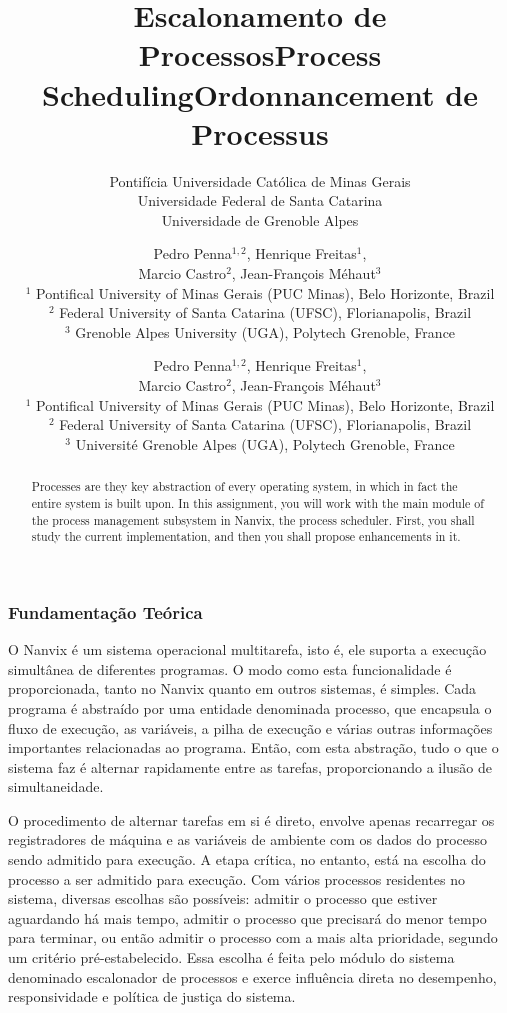 \documentclass[11pt]{article}
\title{Escalonamento de Processos}
\author{
	\small Pontifícia Universidade Católica de Minas Gerais\\
	\small Universidade Federal de Santa Catarina\\
	\small Universidade de Grenoble Alpes
}
\date{}
\title{Process Scheduling}
\author {
	Pedro Penna$^{1,2}$, Henrique Freitas$^{1}$,\\
	Marcio Castro$^{2}$, Jean-François Méhaut$^{3}$\\[0.3em]
	\small $^{1}$ Pontifical University of Minas Gerais (PUC Minas), Belo Horizonte, Brazil\\
	\small $^{2}$ Federal University of Santa Catarina (UFSC), Florianapolis, Brazil\\
	\small $^{3}$ Grenoble Alpes University (UGA), Polytech Grenoble, France}
\date {}
\title{Ordonnancement de Processus}
\author {
	Pedro Penna$^{1,2}$, Henrique Freitas$^{1}$,\\
	Marcio Castro$^{2}$, Jean-François Méhaut$^{3}$\\[0.3em]
	\small $^{1}$ Pontifical University of Minas Gerais (PUC Minas), Belo Horizonte, Brazil\\
	\small $^{2}$ Federal University of Santa Catarina (UFSC), Florianapolis, Brazil\\
	\small $^{3}$ Université Grenoble Alpes (UGA), Polytech Grenoble, France}
\date {}
\newif\ifbr
\newif\ifen
\newif\iffr
\begin{document}
\maketitle

\begin{abstract}

\ifbr
	\noindent Processos consistem na abstração fundamental de um sistema
	operacional: todo o resto do sistema é arquitetado com base nesta
	entidade. Neste projeto, você trabalhará com o principal componente do
	módulo de gerenciamento de processos do Nanvix, o escalonador de
	processos. Primeiramente, você irá estudar como o componente existente
	opera e, em seguida, irá propor melhorias a ele.
\else\ifen
	\noindent Processes are they key abstraction of every operating
	system, in which in fact the entire system is built upon. In this
	assignment, you will work with the main module of the process
	management subsystem in Nanvix, the process scheduler. First, you shall
	study the current implementation, and then you shall propose
	enhancements in it.
\else\iffr
	\noindent Le processus est l'abstraction clé de tout système
	d'exploitation. La conséquence est qu'un système d'exploitation,
	comme Nanvix, repose sur ce concept. Pour cette étape, vous
	travaillerez sur le module principal du sous-système de gestion des
	processus de Nanvix, l'ordonnanceur de processus (\textit{process
	scheduler}). Au départ, vous étudierez et analyserez
	l'implémentation fournie avec Nanvix, et vous proposerez et
	implémenterez ensuite des extensions à cet ordonnanceur.
\fi\fi\fi

\end{abstract}

\ifbr
	\subsubsection*{Fundamentação Teórica}

		O Nanvix é um sistema operacional multitarefa, isto é, ele suporta a
		execução simultânea de diferentes programas. O modo como esta
		funcionalidade é proporcionada, tanto no Nanvix quanto em outros
		sistemas, é simples. Cada programa é abstraído por uma entidade
		denominada processo, que encapsula o fluxo de execução, as
		variáveis, a pilha de execução e várias outras informações
		importantes relacionadas ao programa. Então, com esta abstração,
		tudo o que o sistema faz é alternar rapidamente entre as tarefas,
		proporcionando a ilusão de simultaneidade.

		O procedimento de alternar tarefas em si é direto, envolve apenas
		recarregar os registradores de máquina e as variáveis de ambiente
		com os dados do processo sendo admitido para execução. A etapa
		crítica, no entanto, está na escolha do processo a ser admitido para
		execução. Com vários processos residentes no sistema, diversas
		escolhas são possíveis: admitir o processo que estiver aguardando há
		mais tempo, admitir o processo que precisará do menor tempo para
		terminar, ou então admitir o processo com a mais alta prioridade,
		segundo um critério pré-estabelecido. Essa escolha é feita pelo
		módulo do sistema denominado escalonador de processos e exerce
		influência direta no desempenho, responsividade e política de
		justiça do sistema.
\else\ifen
\end{document}
